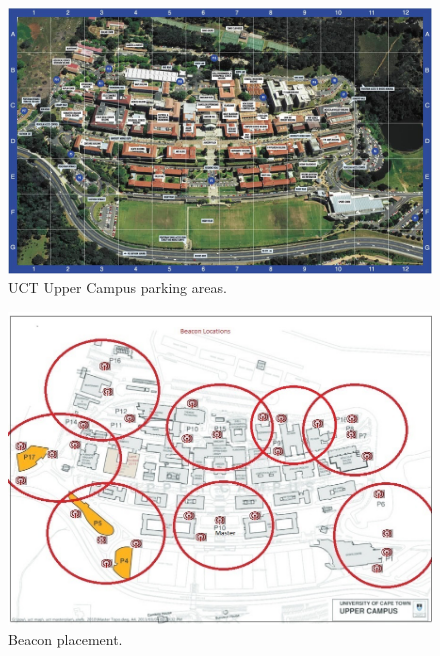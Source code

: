 \newpage
\begin{figure}[H]
\begin{center}
\includegraphics[scale=0.3]{data/mechanical/8.png}
\caption{UCT Upper Campus parking areas.}
\label{fig:mech-8}
\end{center}
\end{figure}

\begin{figure}[H]
\begin{center}
\includegraphics[scale=0.5]{data/mechanical/9.jpg}
\caption{Beacon placement.}
\label{fig:mech-9}
\end{center}
\end{figure}

\newpage








